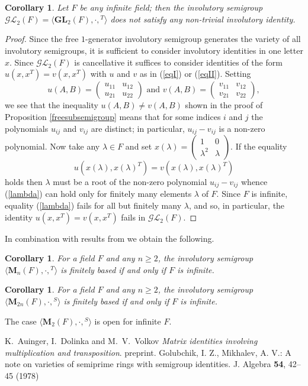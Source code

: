 \documentclass[11pt,reqno]{amsart}
\newtheorem{Cor}[Thm]{Corollary}
\theoremstyle{remark}
\begin{document}
\begin{Cor} Let $F$ be any infinite field; then the involutory semigroup $\mathcal{GL}_2(F)=\langle
\mathbf{GL}_2(F),\cdot,{}^T\rangle$ does not satisfy any non-trivial involutory identity.
\end{Cor}
\begin{proof} Since the free $1$-generator involutory semigroup generates the variety of all involutory semigroups,
it is sufficient to consider involutory identities in one letter $x$. Since $\mathcal{GL}_2(F)$ is
cancellative it suffices to consider identities of the form
$u(x,x^T)=v(x,x^T)$ with $u$ and $v$ as in (\ref{eqI}) or (\ref{eqII}). Setting
$$u(A,B)=\begin{pmatrix} u_{11}&u_{12}\\u_{21} & u_{22}\end{pmatrix}\mbox{ and }v(A,B)=\begin{pmatrix}
v_{11} & v_{12}\\ v_{21} & v_{22}\end{pmatrix},$$ we see that the inequality $u(A,B)\ne v(A,B)$ shown in the
proof of Proposition \ref{freesubsemigroup}  means that for some indices $i$ and $j$ the polynomials
$u_{ij}$ and $v_{ij}$ are distinct; in particular, $u_{ij}-v_{ij}$ is a non-zero polynomial. Now take any
$\lambda\in F$
and set $x(\lambda)=\left(\begin{smallmatrix} 1 & 0\\ \lambda^2 & \lambda\end{smallmatrix}\right)$. If the equality
\begin{equation}\label{lambda}
u(x(\lambda),x(\lambda)^T)=v(x(\lambda),x(\lambda)^T)
\end{equation} holds then $\lambda$ must be a root of the non-zero polynomial
$u_{ij}-v_{ij}$ whence (\ref{lambda}) can hold only for finitely many elements $\lambda$ of $F$. Since $F$ is
infinite, equality (\ref{lambda}) fails for all but finitely many $\lambda$, and so, in particular, the identity
$u(x,x^T)=v(x,x^T)$ fails in $\mathcal{GL}_2(F)$.
\end{proof}
In combination with results from \cite{adv1} we obtain the following.
\begin{Cor} For a field $F$ and any $n\ge 2$, the involutory semigroup $\langle\mathbf{M}_n(F),\cdot,{}^T\rangle$
is finitely based if
and only if $F$ is infinite.
\end{Cor}
\begin{Cor} For a field $F$ and any $n\ge 2$, the involutory semigroup $\langle \mathbf{M}_{2n}(F),\cdot,{}^S\rangle$ is
finitely based if and only if $F$ is infinite.
\end{Cor}
The case $\langle \mathbf{M}_{2}(F),\cdot,{}^S\rangle$ is open for infinite $F$.
\begin{thebibliography}{99}
 K.~Auinger, I.~Dolinka and M.~V.~Volkov \emph{Matrix identities involving multiplication and transposition}. preprint.
Golubchik, I. Z., Mikhalev, A. V.: A note on varieties of semiprime rings with semigroup identities. J. Algebra
\textbf{54}, 42--45 (1978)
\end{thebibliography}
\end{document}
